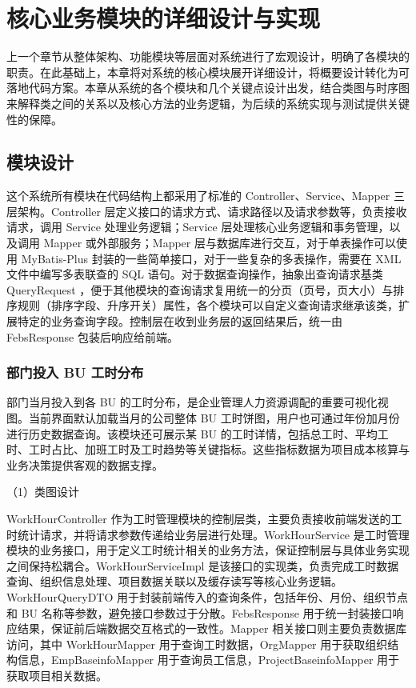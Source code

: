 \chapter{核心业务模块的详细设计与实现}
上一个章节从整体架构、功能模块等层面对系统进行了宏观设计，明确了各模块的职责。在此基础上，本章将对系统的核心模块展开详细设计，将概要设计转化为可落地代码方案。本章从系统的各个模块和几个关键点设计出发，结合类图与时序图来解释类之间的关系以及核心方法的业务逻辑，为后续的系统实现与测试提供关键性的保障。

\section{模块设计}
这个系统所有模块在代码结构上都采用了标准的 Controller、Service、Mapper 三层架构。Controller 层定义接口的请求方式、请求路径以及请求参数等，负责接收请求，调用 Service 处理业务逻辑；Service 层处理核心业务逻辑和事务管理，以及调用 Mapper 或外部服务；Mapper 层与数据库进行交互，对于单表操作可以使用 MyBatis-Plus 封装的一些简单接口，对于一些复杂的多表操作，需要在 XML 文件中编写多表联查的 SQL 语句。对于数据查询操作，抽象出查询请求基类 QueryRequest ，便于其他模块的查询请求复用统一的分页（页号，页大小）与排序规则（排序字段、升序开关）属性，各个模块可以自定义查询请求继承该类，扩展特定的业务查询字段。控制层在收到业务层的返回结果后，统一由 FebsResponse 包装后响应给前端。

\subsection{部门投入 BU 工时分布}
部门当月投入到各 BU 的工时分布，是企业管理人力资源调配的重要可视化视图。当前界面默认加载当月的公司整体 BU 工时饼图，用户也可通过年份加月份进行历史数据查询。该模块还可展示某 BU 的工时详情，包括总工时、平均工时、工时占比、加班工时及工时趋势等关键指标。这些指标数据为项目成本核算与业务决策提供客观的数据支撑。

（1）类图设计

WorkHourController 作为工时管理模块的控制层类，主要负责接收前端发送的工时统计请求，并将请求参数传递给业务层进行处理。WorkHourService 是工时管理模块的业务接口，用于定义工时统计相关的业务方法，保证控制层与具体业务实现之间保持松耦合。WorkHourServiceImpl 是该接口的实现类，负责完成工时数据查询、组织信息处理、项目数据关联以及缓存读写等核心业务逻辑。WorkHourQueryDTO 用于封装前端传入的查询条件，包括年份、月份、组织节点和 BU 名称等参数，避免接口参数过于分散。FebsResponse 用于统一封装接口响应结果，保证前后端数据交互格式的一致性。Mapper 相关接口则主要负责数据库访问，其中 WorkHourMapper 用于查询工时数据，OrgMapper 用于获取组织结构信息，EmpBaseinfoMapper 用于查询员工信息，ProjectBaseinfoMapper 用于获取项目相关数据。
\clearpage

